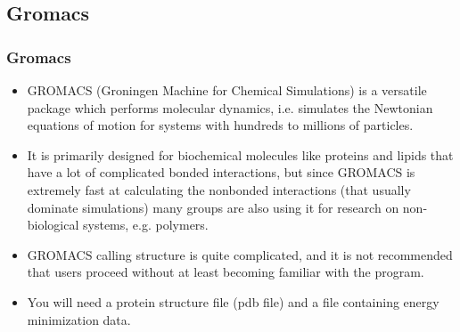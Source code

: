 \documentclass[slidestop,mathserif,compress,xcolor=svgnames]{beamer}
\newenvironment{bblock}[0]
{
\begin{beamerboxesrounded}[upper=uppercol1,lower=lowercol1,shadow=true]}
{\end{beamerboxesrounded}}
\begin{document}
\subsection{Gromacs}
\begin{frame}
  \frametitle{\small Gromacs}
  \begin{bblock}{}
    \begin{itemize}
      \item GROMACS (Groningen Machine for Chemical Simulations) is a versatile package which performs molecular dynamics, i.e. simulates the Newtonian equations of motion for systems with hundreds to millions of particles.
      \item It is primarily designed for biochemical molecules like proteins and lipids that have a lot of complicated bonded interactions, but since GROMACS is extremely fast at calculating the nonbonded interactions (that usually dominate simulations) many groups are also using it for research on non-biological systems, e.g. polymers. 
      \item GROMACS calling structure is quite complicated, and it is not recommended that users proceed without at least becoming familiar with the program.
      \item You will need a protein structure file (pdb file) and a file containing energy minimization data.
    \end{itemize}
  \end{bblock}
\end{frame}
\end{document}
